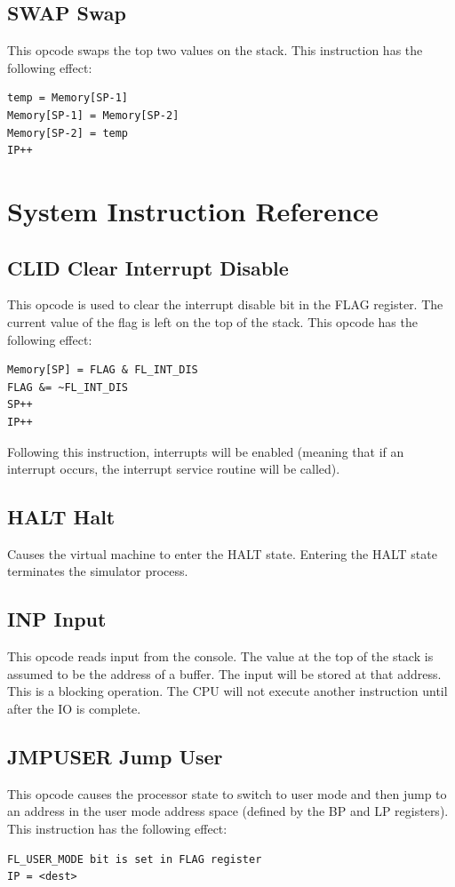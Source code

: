 \documentclass[11pt,a4paper,oneside]{book}
\begin{document}
\pagebreak
\section[SWAP]{\texorpdfstring{SWAP \hfill Swap}{SWAP -- Swap}}
This opcode swaps the top two values on the stack. This instruction has the following effect:
\begin{verbatim}
temp = Memory[SP-1]
Memory[SP-1] = Memory[SP-2]
Memory[SP-2] = temp
IP++
\end{verbatim}

\chapter{System Instruction Reference}

\pagebreak
\section[CLID]{\texorpdfstring{CLID \hfill Clear Interrupt Disable}{CLID -- Clear Interrupt Disable}}
This opcode is used to clear the interrupt disable bit in the FLAG register. The current value of
the flag is left on the top of the stack. This opcode has the following effect:
\begin{verbatim}
Memory[SP] = FLAG & FL_INT_DIS
FLAG &= ~FL_INT_DIS
SP++
IP++
\end{verbatim}
Following this instruction, interrupts will be enabled (meaning that if an interrupt occurs, the
interrupt service routine will be called).

\pagebreak
\section[HALT]{\texorpdfstring{HALT \hfill Halt}{HALT -- Halt}}
Causes the virtual machine to enter the HALT state. Entering the HALT state terminates
the simulator process.

\pagebreak
\section[INP]{\texorpdfstring{INP \hfill Input}{INP -- Input}}
This opcode reads input from the console. The value at the top of the stack is assumed to be the
address of a buffer. The input will be stored at that address. This is a blocking operation. The CPU will not execute another instruction until after the IO is complete.

\pagebreak
\section[JMPUSER]{\texorpdfstring{JMPUSER \hfill Jump User}{JMPUSER -- Jump User}}
This opcode causes the processor state to switch to user mode and then jump to an address in the user mode address space (defined by the BP and LP registers). This instruction has the following effect:
\begin{verbatim}
FL_USER_MODE bit is set in FLAG register
IP = <dest>
\end{verbatim}
\end{document}
